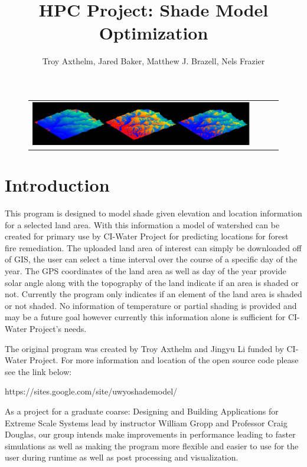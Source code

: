 \documentclass[]{article}%
\title{HPC Project: Shade Model Optimization}
\author{Troy Axthelm, Jared Baker, Matthew J. Brazell, Nels Frazier}
\begin{document}
\maketitle
\begin{figure}[H]
\centering
  \begin{tabular}{@{}cccc@{}}
    \includegraphics[width=.75\textwidth]{./figures/titleBar.png} 
  \end{tabular}
  \caption{}
  \label{}
\end{figure}


\listoffigures



\section{Introduction}


This program is designed to model shade given elevation and location information for a selected land area. With this information a model of watershed can be created for primary use by CI-Water Project for predicting locations for forest fire remediation. The uploaded land area of interest can simply be downloaded off of GIS, the user can select a time interval over the course of a specific day of the year. The GPS coordinates of the land area as well as day of the year provide solar angle along with the topography of the land indicate if an area is shaded or not. Currently the program  only indicates if an element of the land area is shaded or not shaded. No information of temperature or partial shading is provided and may be a future goal however currently this information alone is sufficient for CI-Water Project's needs.

The original program was created by Troy Axthelm and Jingyu Li  funded by CI-Water Project. For more information and location of the open source code please see the link below:

https://sites.google.com/site/uwyoshademodel/

As a project for a graduate coarse: Designing and Building Applications for Extreme Scale Systems lead by instructor William Gropp and Professor Craig Douglas, our group intends make improvements in performance leading to faster simulations as well as making the program more flexible and easier to use for the user during runtime as well as post processing and visualization.
\end{document}
